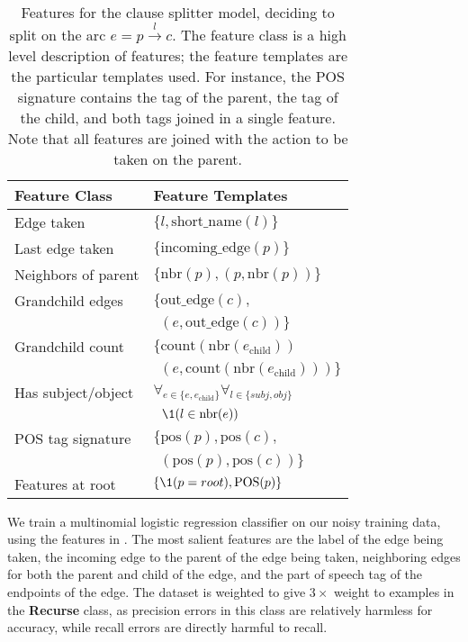 \begin{table}
\begin{center}
\begin{tabular}{ll}
  \textbf{Feature Class} & \textbf{Feature Templates} \\
  \hline
  Edge taken          & $\{ l, \textrm{short\_name}(l) \}$ \\
  Last edge taken     & $\{ \textrm{incoming\_edge}(p) \}$ \\
  Neighbors of parent & $\{ \textrm{nbr}(p), (p, \textrm{nbr}(p)) \}$ \\
  Grandchild edges    & $\{ \textrm{out\_edge}(c), $ \\
                      & $~~ (e, \textrm{out\_edge}(c)) \}$ \\
  Grandchild count    & $\{ \textrm{count}\left( \textrm{nbr}(e_\textrm{child}) \right) $ \\
                      & $~~ \left(e, \textrm{count}\left( \textrm{nbr}(e_\textrm{child}) \right) \right) \}$ \\
  Has subject/object  & $\forall_{e \in \{e, e_\textrm{child}\}} \forall_{l \in \{\textit{subj}, \textit{obj}\}} $ \\
                      & $~~ \1(l \in \textrm{nbr}(e)) $ \\
  POS tag signature   & $\{ \textrm{pos}(p), \textrm{pos}(c), $ \\
                      & $~~ \left( \textrm{pos}(p), \textrm{pos}(c) \right) \}$ \\
  Features at root    & $\{ \1(p = root), \textrm{POS}(p) \}$
\end{tabular}
\end{center}
\caption{\label{tab:features}
Features for the clause splitter model, deciding to split on the arc
  $e = p \xrightarrow{l} c$.
The feature class is a high level description of features; the feature
  templates are the particular templates used.
For instance, the POS signature contains the tag of the parent, the tag of
  the child, and both tags joined in a single feature.
Note that all features are joined with the action to be taken on the parent.
}
\end{table}

We train a multinomial logistic regression classifier on our noisy
  training data, using the features in .
The most salient features are the label of the edge being taken, the
  incoming edge to the parent of the edge being taken, neighboring edges
  for both the parent and child of the edge, and the part of speech tag of
  the endpoints of the edge.
The dataset is weighted to give $3\times$ weight to examples in the \textbf{Recurse}
  class, as precision errors in this class are relatively harmless for accuracy,
  while recall errors are directly harmful to recall.

